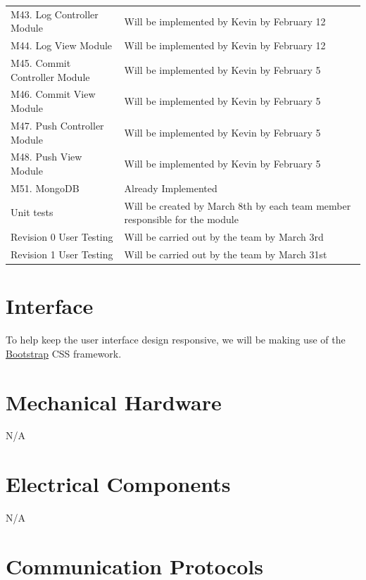 \documentclass[12pt, titlepage]{article}
\begin{document}
\begin{longtable}{p{} p{}}
		M43. Log Controller Module &  Will be implemented by Kevin by February 12  \\
		M44. Log View Module &  Will be implemented by Kevin by February 12  \\
		M45. Commit Controller Module &  Will be implemented by Kevin by February 5  \\
		M46. Commit View Module &  Will be implemented by Kevin by February 5  \\
		M47. Push Controller Module &  Will be implemented by Kevin by February 5  \\
		M48. Push View Module &  Will be implemented by Kevin by February 5  \\
		M51. MongoDB &  Already Implemented  \\
		Unit tests &  Will be created by March 8th by each team member responsible for the module  \\
		Revision 0 User Testing &  Will be carried out by the team by March 3rd \\
		Revision 1 User Testing &  Will be carried out by the team by March 31st \\
		\bottomrule
	\end{longtable}
	\normalsize
	
	\newpage{}
	
	\appendix
	
	\section{Interface}
	
	To help keep the user interface design responsive, we will be making use of the \href{https://getbootstrap.com/docs/4.1/getting-started/introduction/}{Bootstrap} CSS framework.
	
	\section{Mechanical Hardware}
	N/A
	
	\section{Electrical Components}
	N/A
	
	\section{Communication Protocols}
	
\end{document}
